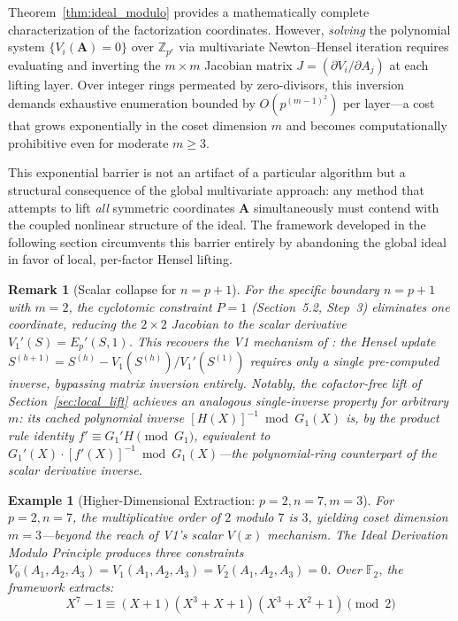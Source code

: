 \documentclass[12pt]{article}
\theoremstyle{plain}
\newtheorem{rem}{Remark}
\newtheorem{example}{Example}
\begin{document}
Theorem~\ref{thm:ideal_modulo} provides a mathematically complete characterization of the factorization coordinates. However, \emph{solving} the polynomial system $\{V_i(\mathbf{A}) = 0\}$ over $\mathbb{Z}_{p^e}$ via multivariate Newton--Hensel iteration requires evaluating and inverting the $m \times m$ Jacobian matrix $J = (\partial V_i / \partial A_j)$ at each lifting layer. Over integer rings permeated by zero-divisors, this inversion demands exhaustive enumeration bounded by $O(p^{(m-1)^2})$ per layer---a cost that grows exponentially in the coset dimension $m$ and becomes computationally prohibitive even for moderate $m \geq 3$.

This exponential barrier is not an artifact of a particular algorithm but a structural consequence of the global multivariate approach: any method that attempts to lift \emph{all} symmetric coordinates $\mathbf{A}$ simultaneously must contend with the coupled nonlinear structure of the ideal. The framework developed in the following section circumvents this barrier entirely by abandoning the global ideal in favor of local, per-factor Hensel lifting.

\begin{rem}[Scalar collapse for $n=p+1$]
For the specific boundary $n=p+1$ with $m=2$, the cyclotomic constraint $P=1$ (Section~5.2, Step~3) eliminates one coordinate, reducing the $2 \times 2$ Jacobian to the scalar derivative $V_1'(S) = E_p'(S, 1)$. This recovers the V1 mechanism of \cite{Wang2026ISIT}: the Hensel update $S^{(h+1)} = S^{(h)} - V_1(S^{(h)}) / V_1'(S^{(1)})$ requires only a single pre-computed inverse, bypassing matrix inversion entirely. Notably, the cofactor-free lift of Section~\ref{sec:local_lift} achieves an analogous single-inverse property for arbitrary $m$: its cached polynomial inverse $[H(X)]^{-1} \bmod G_1(X)$ is, by the product rule identity $f' \equiv G_1' H \pmod{G_1}$, equivalent to $G_1'(X) \cdot [f'(X)]^{-1} \bmod G_1(X)$---the polynomial-ring counterpart of the scalar derivative inverse.
\end{rem}

\begin{example}[Higher-Dimensional Extraction: $p=2, n=7, m=3$]
For $p=2, n=7$, the multiplicative order of $2$ modulo $7$ is $3$, yielding coset dimension $m=3$---beyond the reach of V1's scalar $V(x)$ mechanism. The Ideal Derivation Modulo Principle produces three constraints $V_0(A_1, A_2, A_3) = V_1(A_1, A_2, A_3) = V_2(A_1, A_2, A_3) = 0$. Over $\mathbb{F}_2$, the framework extracts:
\begin{equation}
    X^7-1 \equiv (X+1)(X^3+X+1)(X^3+X^2+1) \pmod 2
\end{equation}
\end{example}
\end{document}
